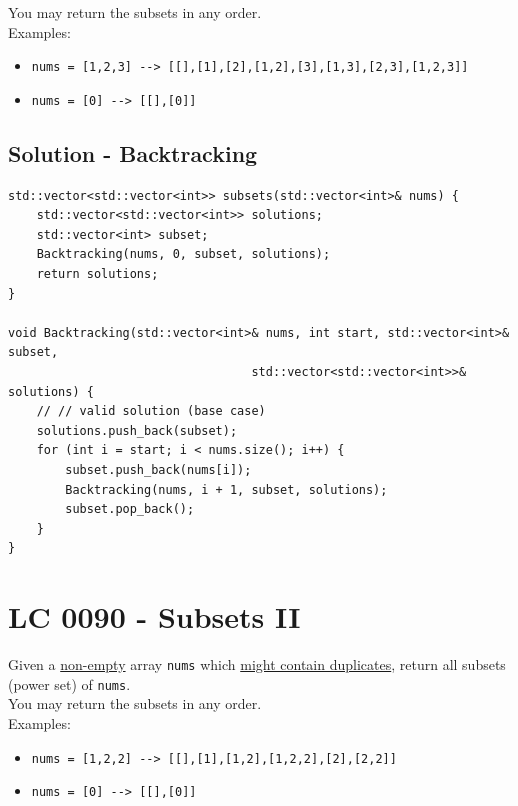 You may return the subsets in any order.\\

Examples:
\begin{itemize}
	\item {\colorbox{CodeBackground}{\lstinline|nums = [1,2,3] --> [[],[1],[2],[1,2],[3],[1,3],[2,3],[1,2,3]]|}}
	\item {\colorbox{CodeBackground}{\lstinline|nums = [0] --> [[],[0]]|}}
\end{itemize}

\subsection*{Solution - Backtracking}
\begin{lstlisting}
std::vector<std::vector<int>> subsets(std::vector<int>& nums) {
	std::vector<std::vector<int>> solutions;
	std::vector<int> subset;
	Backtracking(nums, 0, subset, solutions);
	return solutions;
}

void Backtracking(std::vector<int>& nums, int start, std::vector<int>& subset,
								  std::vector<std::vector<int>>& solutions) {
	// // valid solution (base case)
	solutions.push_back(subset);
	for (int i = start; i < nums.size(); i++) {
		subset.push_back(nums[i]);
		Backtracking(nums, i + 1, subset, solutions);
		subset.pop_back();
	}
}
\end{lstlisting}

\section{LC 0090 - Subsets II}
Given a \ul{non-empty} array {\colorbox{CodeBackground}{\lstinline|nums|}} which \ul{might contain duplicates}, return all subsets (power set) of {\colorbox{CodeBackground}{\lstinline|nums|}}.\\

You may return the subsets in any order.\\

Examples:
\begin{itemize}
	\item {\colorbox{CodeBackground}{\lstinline|nums = [1,2,2] --> [[],[1],[1,2],[1,2,2],[2],[2,2]]|}}
	\item {\colorbox{CodeBackground}{\lstinline|nums = [0] --> [[],[0]]|}}
\end{itemize}


